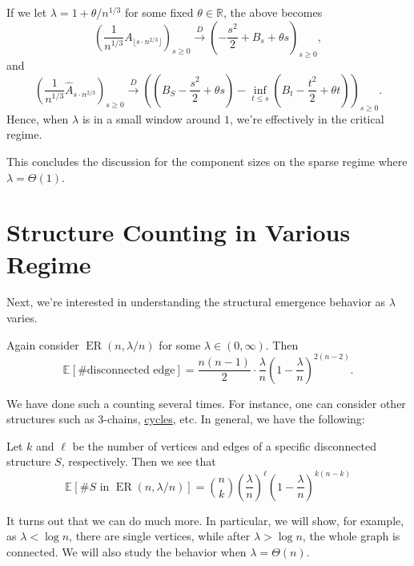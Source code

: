 \begin{remark}
	If we let \(\lambda = 1 + \theta / n^{1 / 3} \) for some fixed \(\theta \in \mathbb{R} \), the above becomes
	\[
		\left( \frac{1}{n^{1 / 3}} A_{\lfloor s \cdot n^{2 / 3} \rfloor } \right) _{s \geq 0}
		\overset{D}{\to} \left( - \frac{s^2}{2} + B_s + \theta s\right) _{s \geq 0},
	\]
	and
	\[
		\left( \frac{1}{n^{1 / 3}} \hat{A} _{s \cdot n^{2 / 3}} \right) _{s \geq 0}
		\overset{D}{\to} \left( \left( B_S - \frac{s^2}{2} + \theta s\right) - \inf _{t \leq s} \left( B_t - \frac{t^2}{2} + \theta t \right)  \right)_{s \geq 0}.
	\]
	Hence, when \(\lambda \) is in a small window around \(1\), we're effectively in the critical regime.
\end{remark}

This concludes the discussion for the component sizes on the sparse regime where \(\lambda = \Theta (1)\).

\section{Structure Counting in Various Regime}
Next, we're interested in understanding the structural emergence behavior as \(\lambda \) varies.

\begin{eg}
	Again consider \(\operatorname{ER}(n, \lambda / n) \) for some \(\lambda \in (0, \infty )\). Then
	\[
		\mathbb{E}_{}[\text{\#disconnected edge} ]
		= \frac{n(n-1)}{2} \cdot \frac{\lambda}{n} \left( 1 - \frac{\lambda}{n} \right) ^{2 (n-2)}.
	\]
\end{eg}

We have done such a counting several times. For instance, one can consider other structures such as \(3\)-chains, \hyperref[def:cycle]{cycles}, etc. In general, we have the following:

\begin{eg}
	Let \(k\) and \(\ell \) be the number of vertices and edges of a specific disconnected structure \(S\), respectively. Then we see that
	\[
		\mathbb{E}_{}[\# S \text{ in } \operatorname{ER}(n, \lambda / n) ]
		= \binom{n}{k} \left( \frac{\lambda}{n} \right) ^{\ell } \left( 1 - \frac{\lambda}{n} \right) ^{k(n-k)}
	\]
\end{eg}

It turns out that we can do much more. In particular, we will show, for example, as \(\lambda < \log n\), there are single vertices, while after \(\lambda > \log n\), the whole graph is connected. We will also study the behavior when \(\lambda = \Theta (n)\).
